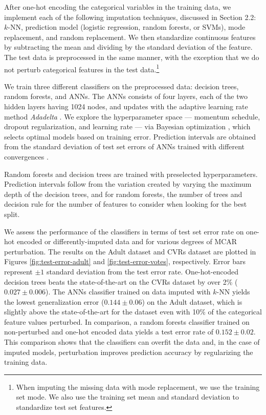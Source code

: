 \documentclass[10pt]{book}
\theoremstyle{definition}
\begin{document}
After one-hot encoding the categorical variables in the training data, we implement each of the following imputation techniques, discussed in Section 2.2: $k$-NN, prediction model (logistic regression, random forests, or SVMs), mode replacement, and random replacement. We then standardize continuous features by subtracting the mean and dividing by the standard deviation of the feature. The test data is preprocessed in the same manner, with the exception that we do not perturb categorical features in the test data.\footnote{When imputing the missing data with mode replacement, we use the training set mode. We also use the training set mean and standard deviation to standardize test set features.\nocite{rubin1995}}

\par
{}

We train three different classifiers on the preprocessed data: decision trees, random forests, and ANNs. The ANNs consists of four layers, each of the two hidden layers having 1024 nodes, and updates with the adaptive learning rate method \emph{Adadelta} \citep{zeiler2012}. We explore the hyperparameter space ---  momentum schedule, dropout regularization, and learning rate --- via Bayesian optimization \citep{snoek2012}, which selects optimal models based on training error. Prediction intervals are obtained from the standard deviation of test set errors of ANNs trained with different convergences \citep{heskes1997}. 

Random forests and decision trees are trained with preselected hyperparameters. Prediction intervals follow from the variation created by varying the maximum depth of the decision trees, and for random forests, the number of trees and decision rule for the number of features to consider when looking for the best split. 

\par
{}

We assess the performance of the classifiers in terms of test set error rate on one-hot encoded or differently-imputed data and for various degrees of MCAR perturbation. The results on the Adult dataset and CVRs dataset are plotted in Figures \ref{fig:test-error-adult} and \ref{fig:test-error-votes}, respectively. Error bars represent $\pm 1$ standard deviation from the test error rate. One-hot-encoded decision trees beats the state-of-the-art on the CVRs dataset by over 2\% ($0.027 \pm 0.006$). The ANNs classifier trained on data imputed with $k$-NN yields the lowest generalization error ($0.144 \pm 0.06$) on the Adult dataset, which is slightly above the state-of-the-art for the dataset even with 10\% of the categorical feature values perturbed. In comparison, a random forests classifier trained on non-perturbed and one-hot encoded data yields a test error rate of $0.152 \pm 0.02$. This comparison shows that the classifiers can overfit the data and, in the case of imputed models, perturbation improves prediction accuracy by regularizing the training data. 
\end{document}

